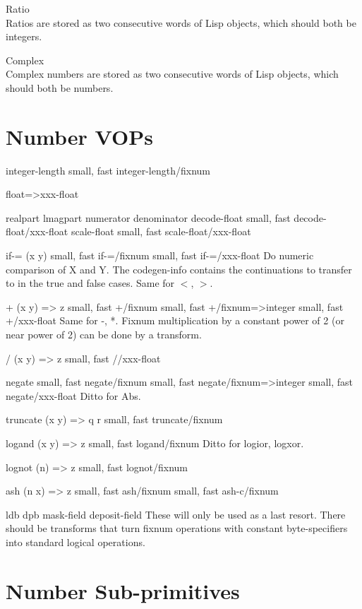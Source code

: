 {
Ratio\\Ratios are stored as two consecutive words of Lisp objects, which should
both be integers.

Complex\\Complex numbers are stored as two consecutive words of Lisp objects,
which should both be numbers.


\section{Number VOPs}

integer-length
{small, fast} integer-length/fixnum

float=>xxx-float

realpart
lmagpart
numerator
denominator
decode-float
{small, fast} decode-float/xxx-float
scale-float
{small, fast} scale-float/xxx-float

if-= (x y)
{small, fast} if-=/fixnum
{small, fast} if-=/xxx-float
    Do numeric comparison of X and Y.  The codegen-info contains the
    continuations to transfer to in the true and false cases.  Same for $<$, $>$.

+ (x y) => z
{small, fast} +/fixnum
{small, fast} +/fixnum=>integer
{small, fast} +/xxx-float
    Same for -, *.   Fixnum multiplication by a constant power of 2 (or near
    power of 2) can be done by a transform.

/ (x y) => z
{small, fast} //xxx-float

negate
{small, fast} negate/fixnum
{small, fast} negate/fixnum=>integer
{small, fast} negate/xxx-float
    Ditto for Abs.

truncate (x y) => q r
{small, fast} truncate/fixnum

logand (x y) => z
{small, fast} logand/fixnum
    Ditto for logior, logxor.
    
lognot (n) => z
{small, fast} lognot/fixnum

ash (n x) => z
{small, fast} ash/fixnum
{small, fast} ash-c/fixnum

ldb
dpb
mask-field
deposit-field
    These will only be used as a last resort.  There should be transforms that
    turn fixnum operations with constant byte-specifiers into standard logical
    operations.

\section{Number Sub-primitives}


}
